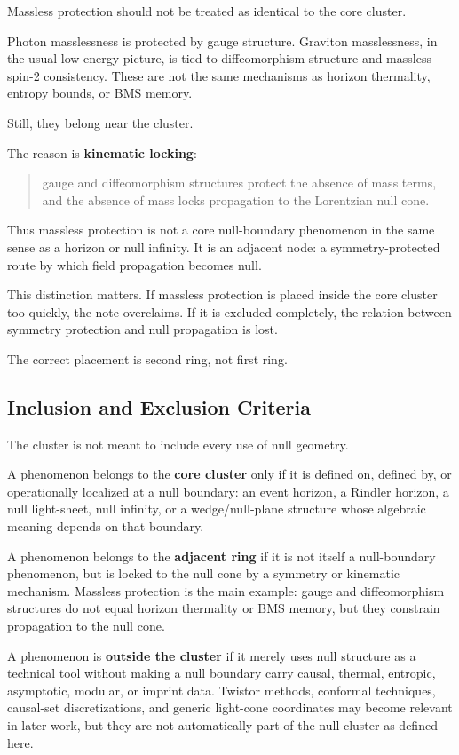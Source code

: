\documentclass[12pt,a4paper]{article}
\theoremstyle{definition}
\theoremstyle{remark}
\begin{document}
Massless protection should not be treated as identical to the core
cluster.

Photon masslessness is protected by gauge structure. Graviton
masslessness, in the usual low-energy picture, is tied to diffeomorphism
structure and massless spin-2 consistency. These are not the same
mechanisms as horizon thermality, entropy bounds, or BMS memory.

Still, they belong near the cluster.

The reason is \textbf{kinematic locking}:

\begin{quote}
gauge and diffeomorphism structures protect the absence of mass terms,
and the absence of mass locks propagation to the Lorentzian null cone.
\end{quote}

Thus massless protection is not a core null-boundary phenomenon in the
same sense as a horizon or null infinity. It is an adjacent node: a
symmetry-protected route by which field propagation becomes null.

This distinction matters. If massless protection is placed inside the
core cluster too quickly, the note overclaims. If it is excluded
completely, the relation between symmetry protection and null
propagation is lost.

The correct placement is second ring, not first ring.

\subsection{Inclusion and Exclusion
Criteria}\label{inclusion-and-exclusion-criteria}

The cluster is not meant to include every use of null geometry.

A phenomenon belongs to the \textbf{core cluster} only if it is defined
on, defined by, or operationally localized at a null boundary: an event
horizon, a Rindler horizon, a null light-sheet, null infinity, or a
wedge/null-plane structure whose algebraic meaning depends on that
boundary.

A phenomenon belongs to the \textbf{adjacent ring} if it is not itself a
null-boundary phenomenon, but is locked to the null cone by a symmetry
or kinematic mechanism. Massless protection is the main example: gauge
and diffeomorphism structures do not equal horizon thermality or BMS
memory, but they constrain propagation to the null cone.

A phenomenon is \textbf{outside the cluster} if it merely uses null
structure as a technical tool without making a null boundary carry
causal, thermal, entropic, asymptotic, modular, or imprint data. Twistor
methods, conformal techniques, causal-set discretizations, and generic
light-cone coordinates may become relevant in later work, but they are
not automatically part of the null cluster as defined here.
\end{document}
